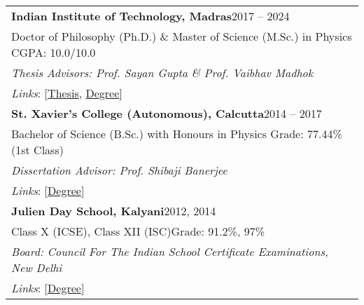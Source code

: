 
\noindent
\begin{tabular}{@{} m{18.5cm}}
\textbf{Indian Institute of Technology, Madras}\hfill 2017 -- 2024\\
Doctor of Philosophy (Ph.D.) \& Master of Science (M.Sc.) in Physics \hfill CGPA: 10.0/10.0\\
\textit{Thesis Advisors: Prof. Sayan Gupta \& Prof. Vaibhav Madhok}\\
\textit{Links}: [\href{https://shodhganga.inflibnet.ac.in/handle/10603/609844}{Thesis}, \href{https://drive.google.com/file/d/1e_EdV3adnDxSkRCMAQGF4_j8DAEQHmok/view?usp=sharing}{Degree}] \\ [0.3cm]

\textbf{St. Xavier's College (Autonomous), Calcutta}\hfill 2014 -- 2017\\
Bachelor of Science (B.Sc.) with Honours in Physics \hfill Grade: 77.44\% (1st Class)\\
\textit{Dissertation Advisor: Prof. Shibaji Banerjee}\\
\textit{Links}: [\href{https://drive.google.com/file/d/1kzH1EiCFbbcnvpbOTWJMMhiCC53tkvDD/view?usp=sharing}{Degree}]\\[0.3cm]

\textbf{Julien Day School, Kalyani}\hfill 2012, 2014\\
Class X (ICSE), Class XII (ISC)\hfill Grade: 91.2\%, 97\%\\
\textit{Board: Council For The Indian School Certificate Examinations, New Delhi}\\
\textit{Links}: [\href{https://drive.google.com/file/d/1rBzB5cY0d9NKxEajnIj6dx8uzIBc41sh/view?usp=sharing}{Degree}]
\end{tabular}